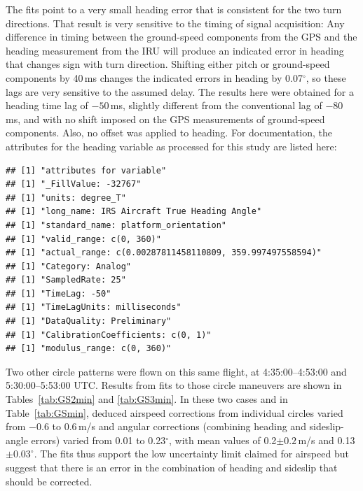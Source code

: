 \documentclass[12pt,twoside,english]{article}\usepackage[]{graphicx}\usepackage[]{color}
\makeatletter
\newenvironment{kframe}{%
 \def\at@end@of@kframe{}%
 \ifinner\ifhmode%
  \def\at@end@of@kframe{\end{minipage}}%
  \begin{minipage}{\columnwidth}%
 \fi\fi%
 \def\FrameCommand##1{\hskip\@totalleftmargin \hskip-\fboxsep
 \colorbox{shadecolor}{##1}\hskip-\fboxsep
     \hskip-\linewidth \hskip-\@totalleftmargin \hskip\columnwidth}%
 \MakeFramed {\advance\hsize-\width
   \@totalleftmargin\z@ \linewidth\hsize
   \@setminipage}}%
 {\par\unskip\endMakeFramed%
 \at@end@of@kframe}
\newenvironment{knitrout}{}{} %
\let\OrgIndex\index
\renewcommand*{\index}[1]{\OrgIndex{#1}}
\makeatother
\begin{document}
The fits point to a very small heading error that is consistent for the two turn directions. That result is very sensitive to the timing of signal acquisition: Any difference in timing between the ground-speed components from the GPS and the heading measurement from the IRU will produce an indicated error in heading that changes sign with turn direction. Shifting either pitch or ground-speed components by 40\,ms changes the indicated errors in heading by 0.07$^{\circ}$, so these lags are very sensitive to the assumed delay. The results here were obtained for a heading time lag of $-50$\,ms, slightly different from the conventional lag of $-80$\,ms, and with no shift imposed on the GPS measurements of ground-speed components. Also, no offset was applied to heading. For documentation, the attributes for the heading variable as processed for this study are listed here: 

\begin{knitrout}\footnotesize
{}\color{fgcolor}\begin{kframe}
\begin{verbatim}
## [1] "attributes for variable"
## [1] "_FillValue: -32767"
## [1] "units: degree_T"
## [1] "long_name: IRS Aircraft True Heading Angle"
## [1] "standard_name: platform_orientation"
## [1] "valid_range: c(0, 360)"
## [1] "actual_range: c(0.00287811458110809, 359.997497558594)"
## [1] "Category: Analog"
## [1] "SampledRate: 25"
## [1] "TimeLag: -50"
## [1] "TimeLagUnits: milliseconds"
## [1] "DataQuality: Preliminary"
## [1] "CalibrationCoefficients: c(0, 1)"
## [1] "modulus_range: c(0, 360)"
\end{verbatim}
\end{kframe}
\end{knitrout}

Two other circle patterns were flown on this same flight, at 4:35:00--4:53:00 and 5:30:00--5:53:00 UTC. Results from fits to those circle maneuvers are shown in Tables~\ref{tab:GS2min} and \ref{tab:GS3min}. In these two cases and in Table~\ref{tab:GSmin}, deduced airspeed corrections from individual circles varied from $-0.6$ to 0.6\,m/s and angular corrections (combining heading and sideslip-angle errors) varied from 0.01 to 0.23$^{\circ}$, with mean values of 0.2$\pm0.2$\,m/s and 0.13$\pm0.03^{\circ}$. 
The fits thus support the low uncertainty limit claimed for airspeed but suggest that there is an error in the combination of heading and sideslip that should be corrected.
\end{document}
